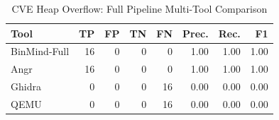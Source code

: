 \begin{table}[htbp]
\centering
\caption{CVE Heap Overflow: Full Pipeline Multi-Tool Comparison}
\label{tab:cve-full-comparison}
\begin{tabular}{lrrrrrrr}
\toprule
Tool & TP & FP & TN & FN & Prec. & Rec. & F1 \\
\midrule
BinMind-Full & 16 & 0 & 0 & 0 & 1.00 & 1.00 & 1.00 \\
Angr & 16 & 0 & 0 & 0 & 1.00 & 1.00 & 1.00 \\
Ghidra & 0 & 0 & 0 & 16 & 0.00 & 0.00 & 0.00 \\
QEMU & 0 & 0 & 0 & 16 & 0.00 & 0.00 & 0.00 \\
\bottomrule
\end{tabular}
\end{table}
